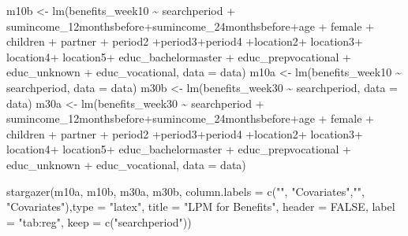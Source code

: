 \documentclass[
]{article}
\newenvironment{Shaded}{\begin{snugshade}}{\end{snugshade}}
\newcommand{\AttributeTok}[1]{\textcolor[rgb]{0.77,0.63,0.00}{#1}}
\newcommand{\ConstantTok}[1]{\textcolor[rgb]{0.00,0.00,0.00}{#1}}
\newcommand{\FunctionTok}[1]{\textcolor[rgb]{0.00,0.00,0.00}{#1}}
\newcommand{\NormalTok}[1]{#1}
\newcommand{\OtherTok}[1]{\textcolor[rgb]{0.56,0.35,0.01}{#1}}
\newcommand{\SpecialCharTok}[1]{\textcolor[rgb]{0.00,0.00,0.00}{#1}}
\newcommand{\StringTok}[1]{\textcolor[rgb]{0.31,0.60,0.02}{#1}}
\begin{document}
\begin{Shaded}
\begin{Highlighting}[]
\NormalTok{m10b }\OtherTok{\textless{}{-}} \FunctionTok{lm}\NormalTok{(benefits\_week10 }\SpecialCharTok{\textasciitilde{}}\NormalTok{ searchperiod }\SpecialCharTok{+}\NormalTok{ sumincome\_12monthsbefore}\SpecialCharTok{+}\NormalTok{sumincome\_24monthsbefore}\SpecialCharTok{+}\NormalTok{age }\SpecialCharTok{+}\NormalTok{ female }\SpecialCharTok{+}\NormalTok{ children }\SpecialCharTok{+}\NormalTok{ partner }\SpecialCharTok{+}\NormalTok{ period2 }\SpecialCharTok{+}\NormalTok{period3}\SpecialCharTok{+}\NormalTok{period4 }\SpecialCharTok{+}\NormalTok{location2}\SpecialCharTok{+}\NormalTok{ location3}\SpecialCharTok{+}\NormalTok{ location4}\SpecialCharTok{+}\NormalTok{ location5}\SpecialCharTok{+}\NormalTok{ educ\_bachelormaster }\SpecialCharTok{+}\NormalTok{ educ\_prepvocational }\SpecialCharTok{+}\NormalTok{ educ\_unknown }\SpecialCharTok{+}\NormalTok{ educ\_vocational, }\AttributeTok{data =}\NormalTok{ data)}
\NormalTok{m10a }\OtherTok{\textless{}{-}} \FunctionTok{lm}\NormalTok{(benefits\_week10 }\SpecialCharTok{\textasciitilde{}}\NormalTok{ searchperiod, }\AttributeTok{data =}\NormalTok{ data)}
\NormalTok{m30b }\OtherTok{\textless{}{-}} \FunctionTok{lm}\NormalTok{(benefits\_week30 }\SpecialCharTok{\textasciitilde{}}\NormalTok{ searchperiod, }\AttributeTok{data =}\NormalTok{ data)}
\NormalTok{m30a }\OtherTok{\textless{}{-}} \FunctionTok{lm}\NormalTok{(benefits\_week30 }\SpecialCharTok{\textasciitilde{}}\NormalTok{ searchperiod }\SpecialCharTok{+}\NormalTok{ sumincome\_12monthsbefore}\SpecialCharTok{+}\NormalTok{sumincome\_24monthsbefore}\SpecialCharTok{+}\NormalTok{age }\SpecialCharTok{+}\NormalTok{ female }\SpecialCharTok{+}\NormalTok{ children }\SpecialCharTok{+}\NormalTok{ partner }\SpecialCharTok{+}\NormalTok{ period2 }\SpecialCharTok{+}\NormalTok{period3}\SpecialCharTok{+}\NormalTok{period4 }\SpecialCharTok{+}\NormalTok{location2}\SpecialCharTok{+}\NormalTok{ location3}\SpecialCharTok{+}\NormalTok{ location4}\SpecialCharTok{+}\NormalTok{ location5}\SpecialCharTok{+}\NormalTok{ educ\_bachelormaster }\SpecialCharTok{+}\NormalTok{ educ\_prepvocational }\SpecialCharTok{+}\NormalTok{ educ\_unknown }\SpecialCharTok{+}\NormalTok{ educ\_vocational, }\AttributeTok{data =}\NormalTok{ data)}

\FunctionTok{stargazer}\NormalTok{(m10a, m10b, m30a, m30b, }\AttributeTok{column.labels =} \FunctionTok{c}\NormalTok{(}\StringTok{""}\NormalTok{, }\StringTok{"Covariates"}\NormalTok{,}\StringTok{""}\NormalTok{, }\StringTok{"Covariates"}\NormalTok{),}\AttributeTok{type =} \StringTok{"latex"}\NormalTok{,}
          \AttributeTok{title =} \StringTok{"LPM for Benefits"}\NormalTok{, }\AttributeTok{header =} \ConstantTok{FALSE}\NormalTok{, }\AttributeTok{label =} \StringTok{"tab:reg"}\NormalTok{, }\AttributeTok{keep =} \FunctionTok{c}\NormalTok{(}\StringTok{"searchperiod"}\NormalTok{))}
\end{Highlighting}
\end{Shaded}
\end{document}
